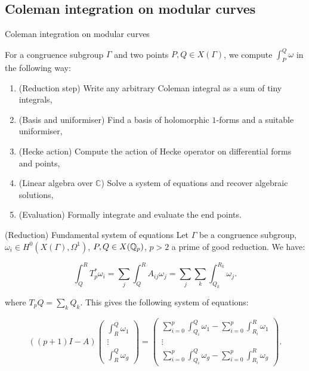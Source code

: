 \subsection{Coleman integration on modular curves}

\begin{frame}{Coleman integration on modular curves}

For a congruence subgroup $\Gamma$ and two points $P,Q \in X(\Gamma)$, we compute $\int_P^Q \omega$ in the following way:

\begin{enumerate}
\pause \item (Reduction step) Write any arbitrary Coleman integral as a sum of tiny integrals,
\pause \item (Basis and uniformiser) Find a basis of holomorphic $1$-forms and a suitable uniformiser,
\pause \item (Hecke action) Compute the action of Hecke operator on differential forms and points,
\pause \item (Linear algebra over $\mathbb{C}$) Solve a system of equations and recover algebraic solutions,
\pause \item (Evaluation) Formally integrate and evaluate the end points.
\end{enumerate}
\end{frame}

\begin{frame}{(Reduction) Fundamental system of equations}
Let $\Gamma$ be a congruence subgroup, $\omega_i \in H^0(X(\Gamma), \Omega^1)$, $P,Q \in X(\mathbb{Q}_p)$, $p >2$ a prime of good reduction. We have:

\[
\int_Q^R T_p^* \omega_i = \sum_j \int_Q^R A_{ij} \omega_j = \sum_j \sum_k \int_{Q_k}^{R_k} \omega_j.
\]

where $T_p Q = \sum_k Q_k.$ \pause This gives the following system of equations: 

\begin{equation*}
   ((p+1)I-A)\begin{pmatrix} \int^Q_R\omega_1 \\\vdots \\ \int^Q_R\omega_g \end{pmatrix} =  \begin{pmatrix} \sum_{i=0}^{p}\int^Q_{Q_i} \omega_1 - \sum_{i=0}^{p}\int^R_{R_i} \omega_1 \\\vdots \\ \sum_{i=0}^{p}\int^Q_{Q_i} \omega_g - \sum_{i=0}^{p}\int^R_{R_i} \omega_g \end{pmatrix}.
\end{equation*}

\end{frame}

